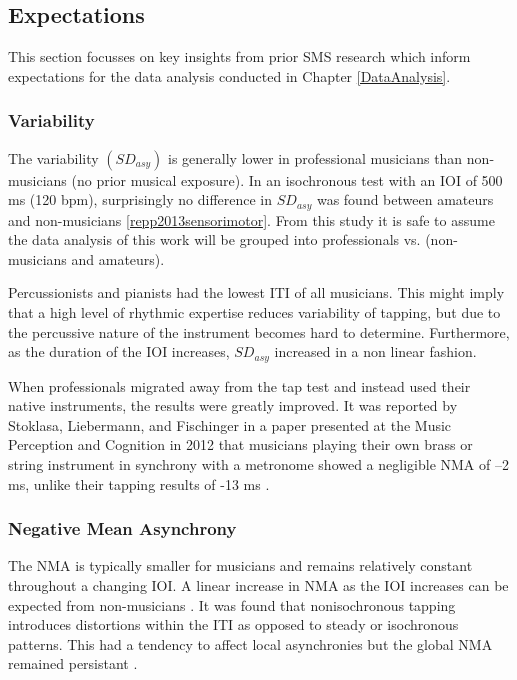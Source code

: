 \subsection{Expectations} \label{SMSFindings}
This section focusses on key insights from prior SMS research which inform expectations for the data analysis conducted in Chapter \ref{DataAnalysis}.

\subsubsection{Variability}
The variability $(SD_{asy})$ is generally lower in professional musicians than non-musicians (no prior musical exposure). In an isochronous test with an IOI of 500 ms (120 bpm), surprisingly no difference in $SD_{asy}$ was found between amateurs and non-musicians \ref{repp2013sensorimotor}. From this study it is safe to assume the data analysis of this work will be grouped into professionals vs. (non-musicians and amateurs).

Percussionists and pianists had the lowest ITI of all musicians. This might imply that a high level of rhythmic expertise reduces variability of tapping, but due to the percussive nature of the instrument becomes hard to determine. Furthermore, as the duration of the IOI increases, $SD_{asy}$ increased in a non linear fashion.

When professionals migrated away from the tap test and instead used their native instruments, the results were greatly improved. It was reported by Stoklasa, Liebermann, and Fischinger in a paper presented at the Music Perception and Cognition in 2012 that musicians playing their own brass or string instrument in synchrony with a metronome showed a negligible NMA of –2  ms, unlike their tapping results of -13 ms \cite{repp2013sensorimotor}.

\subsubsection{Negative Mean Asynchrony}
The NMA is typically smaller for musicians and remains relatively constant throughout a changing IOI. A linear increase in NMA as the IOI increases can be expected from non-musicians \cite{repp2013sensorimotor}. It was found that nonisochronous tapping introduces distortions within the ITI as opposed to steady or isochronous patterns. This had a tendency to affect local asynchronies but the global NMA remained persistant \cite{polak2016both}.
 
